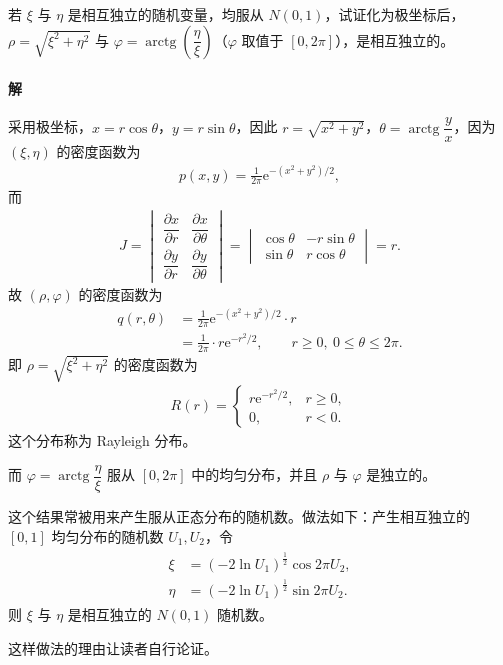 \documentclass[../../main.tex]{subfiles}
\begin{document}
\begin{example}[极坐标变换]\label{example:ch03-极坐标变换}
若 $\xi$ 与 $\eta$ 是相互独立的随机变量，均服从 $N(0,1)$，试证化为极坐标后，$\rho=\sqrt{\xi^{2}+\eta^{2}}$ 与 $\varphi=\operatorname{arctg}\!\left(\dfrac{\eta}{\xi}\right)$（$\varphi$ 取值于 $[0,2\pi]$），是相互独立的。

\paragraph*{解}采用极坐标，$x=r\cos\theta$，$y=r\sin\theta$，因此 $r=\sqrt{x^{2}+y^{2}}$，$\theta=\operatorname{arctg}\dfrac{y}{x}$，因为 $(\xi,\eta)$ 的密度函数为
\begin{align*}p(x,y)=\frac{1}{2\pi}\mathrm{e}^{-(x^{2}+y^{2})/2},\end{align*}
而
\begin{align*}J=\begin{vmatrix}
\dfrac{\partial x}{\partial r} & \dfrac{\partial x}{\partial\theta}\\[4pt]
\dfrac{\partial y}{\partial r} & \dfrac{\partial y}{\partial\theta}
\end{vmatrix}=\begin{vmatrix}
\cos\theta & -r\sin\theta\\
\sin\theta & r\cos\theta
\end{vmatrix}=r.\end{align*}
故 $(\rho,\varphi)$ 的密度函数为
\begin{align*}
q(r,\theta)&=\frac{1}{2\pi}\mathrm{e}^{-(x^{2}+y^{2})/2}\cdot r\\
&=\frac{1}{2\pi}\cdot r\mathrm{e}^{-r^{2}/2},\qquad r\geqslant 0,\ 0\leqslant\theta\leqslant 2\pi.
\end{align*}
即 $\rho=\sqrt{\xi^{2}+\eta^{2}}$ 的密度函数为
\begin{align}
R(r)=
\begin{cases}
r\mathrm{e}^{-r^{2}/2}, & r\geqslant 0,\\
0, & r<0.
\end{cases}\label{align:ch03-rayleigh密度}
\end{align}
这个分布称为 Rayleigh 分布。

而 $\varphi=\operatorname{arctg}\dfrac{\eta}{\xi}$ 服从 $[0,2\pi]$ 中的均匀分布，并且 $\rho$ 与 $\varphi$ 是独立的。

这个结果常被用来产生服从正态分布的随机数。做法如下：产生相互独立的 $[0,1]$ 均匀分布的随机数 $U_1,U_2$，令
\begin{align}
\begin{aligned}
\xi&=(-2\ln U_1)^{\frac{1}{2}}\cos 2\pi U_2,\\
\eta&=(-2\ln U_1)^{\frac{1}{2}}\sin 2\pi U_2.
\end{aligned}\label{align:ch03-boxmuller}
\end{align}
则 $\xi$ 与 $\eta$ 是相互独立的 $N(0,1)$ 随机数。

这样做法的理由让读者自行论证。
\end{example}
\end{document}
